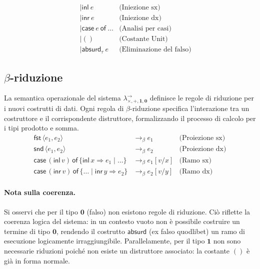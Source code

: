 \begin{equation}
\begin{array}{lrll}
                        &              & \mid \mathsf{inl} \ e                          & \text{(Iniezione sx)}             \\
                        &              & \mid \mathsf{inr} \ e                          & \text{(Iniezione dx)}             \\
                        &              & \mid \mathsf{case}\ e \ \mathsf{of} \ \dots    & \text{(Analisi per casi)}         \\
                        &              & \mid ()                                        & \text{(Costante Unit)}            \\
                        &              & \mid \mathsf{absurd}_\tau \ e                  & \text{(Eliminazione del falso)}       
    \end{array}
    \tag{STLC+}
    \label{eq:extended_stlc_grammar}
\end{equation}

\subsection{\texorpdfstring{$\beta$}{beta}-riduzione}
La semantica operazionale del sistema $\lambda^{\to}_{\times, +, \mathbf{1}, \mathbf{0}}$ definisce le regole di riduzione per i nuovi costrutti di dati. 
Ogni regola di $\beta$-riduzione specifica l'interazione tra un costruttore e il corrispondente distruttore, formalizzando il processo di calcolo per i tipi 
prodotto e somma.
\begin{equation}
    \begin{array}{lll}
        \mathsf{fst} \, \langle e_1, e_2 \rangle & \to_\beta e_1 & \text{(Proiezione sx)} \\
        \mathsf{snd} \, \langle e_1, e_2 \rangle & \to_\beta e_2 & \text{(Proiezione dx)} \\[8pt]
        \mathsf{case} \, (\mathsf{inl} \, v) \, \mathsf{of} \, \{ \mathsf{inl} \, x \Rightarrow e_1 \mid \dots \} & \to_\beta e_1[v/x] & \text{(Ramo sx)} \\
        \mathsf{case} \, (\mathsf{inr} \, v) \, \mathsf{of} \, \{ \dots \mid \mathsf{inr} \, y \Rightarrow e_2 \} & \to_\beta e_2[v/y] & \text{(Ramo dx)}
    \end{array}
    \label{eq:fadt_beta_reduction}
\end{equation}

\paragraph{Nota sulla coerenza.} 
Si osservi che per il tipo $\mathbf{0}$ (falso) non esistono regole di riduzione. Ciò riflette la coerenza logica del sistema: in un contesto vuoto non 
è possibile costruire un termine di tipo $\mathbf{0}$, rendendo il costrutto $\mathsf{absurd}$ (ex falso quodlibet) un ramo di esecuzione logicamente 
irraggiungibile. Parallelamente, per il tipo $\mathbf{1}$ non sono necessarie riduzioni poiché non esiste un distruttore associato: la costante $()$ è 
già in forma normale.

